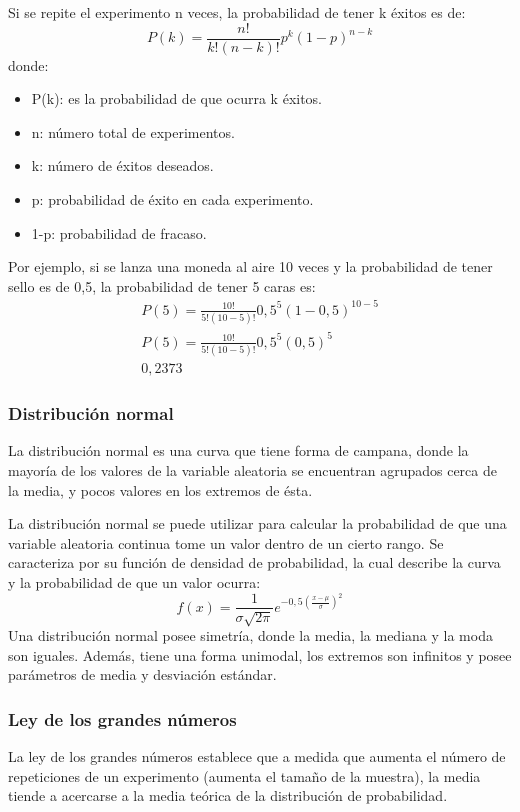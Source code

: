 \documentclass[a4paper, 12pt]{book}
\begin{document}
Si se repite el experimento n veces, la probabilidad de tener k éxitos es de:
\begin{equation}
	P(k) = \frac{n!}{k! (n-k)!}p^{k}(1-p)^{n-k}
\end{equation}
donde:
\begin{itemize}
	\item P(k): es la probabilidad de que ocurra k éxitos.
	\item n: número total de experimentos.
	\item k: número de éxitos deseados.
	\item p: probabilidad de éxito en cada experimento.
	\item 1-p: probabilidad de fracaso.
\end{itemize}
Por ejemplo, si se lanza una moneda al aire 10 veces y la probabilidad de tener sello es de 0,5, la probabilidad de tener 5 caras es:
\begin{gather}
	P(5) = \frac{10!}{5! (10-5)!}0,5^{5}(1-0,5)^{10-5} \\
	P(5) = \frac{10!}{5! (10-5)!}0,5^{5}(0,5)^{5} \\
	0,2373
\end{gather}

\subsubsection{Distribución normal}
La distribución normal es una curva que tiene forma de campana, donde la mayoría de los valores de la variable aleatoria se encuentran agrupados cerca de la media, y pocos valores en los extremos de ésta.

La distribución normal se puede utilizar para calcular la probabilidad de que una variable aleatoria continua tome un valor dentro de un cierto rango. Se caracteriza por su función de densidad de probabilidad, la cual describe la curva y la probabilidad de que un valor ocurra:
\begin{equation}
	f(x) = \frac{1}{\sigma \sqrt{2 \pi}} e^{-0,5(\frac{x - \mu}{\sigma})^2}
\end{equation}
Una distribución normal posee simetría, donde la media, la mediana y la moda son iguales. Además, tiene una forma unimodal, los extremos son infinitos y posee parámetros de media y desviación estándar.

\subsubsection{Ley de los grandes números}
La ley de los grandes números establece que a medida que aumenta el número de repeticiones de un experimento (aumenta el tamaño de la muestra), la media tiende a acercarse a la media teórica de la distribución de probabilidad.
\end{document}
